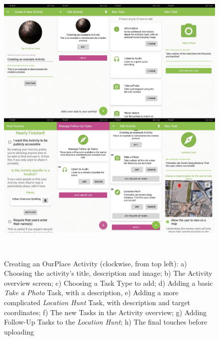 \begin{figure}
  \centering
  \includegraphics[width=1\columnwidth]{images/chapter05/creation.png}
  \caption[Creating an Activity in OurPlace]{Creating an OurPlace Activity (clockwise, from top left): a) Choosing the activity's title, description and image; b) The Activity overview screen; c) Choosing a Task Type to add; d) Adding a basic \textit{Take a Photo} Task, with a description, e) Adding a more complicated \textit{Location Hunt} Task, with description and target coordinates; f) The new Tasks in the Activity overview; g) Adding Follow-Up Tasks to the \textit{Location Hunt}; h) The final touches before uploading }~\label{fig:ActivityCreation}
\end{figure}

